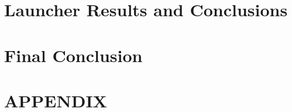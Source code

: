 \clearpage
\section{Launcher Results and Conclusions}
\label{sec:Launcher Results and Conclusions}

\clearpage
\section{Final Conclusion}
\label{sec:Final Conclusion}

\clearpage
\printbibliography


\clearpage
\section{APPENDIX}
\label{sec:APPENDIX}







